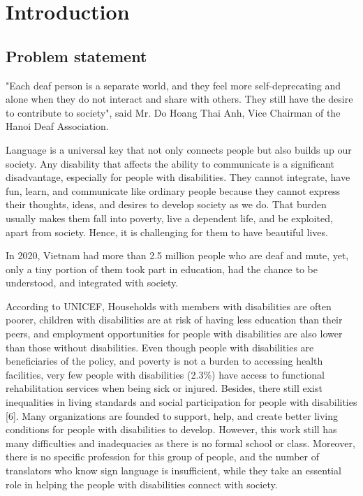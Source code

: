 \chapter{Introduction}
	
\section{Problem statement}

"Each deaf person is a separate world, and they feel more self-deprecating and alone when they do not interact and share with others. They still have the desire to contribute to society", said Mr. Do Hoang Thai Anh, Vice Chairman of the Hanoi Deaf Association\cite{MoCanhCuaHyVong}.

Language is a universal key that not only connects people but also builds up our society. Any disability that affects the ability to communicate is a significant disadvantage, especially for people with disabilities. They cannot integrate, have fun, learn, and communicate like ordinary people because they cannot express their thoughts, ideas, and desires to develop society as we do. That burden usually makes them fall into poverty, live a dependent life, and be exploited, apart from society. Hence, it is challenging for them to have beautiful lives.

In 2020, Vietnam had more than 2.5 million people who are deaf and mute, yet, only a tiny portion of them took part in education, had the chance to be understood, and integrated with society.

According to UNICEF, Households with members with disabilities are often poorer, children with disabilities are at risk of having less education than their peers, and employment opportunities for people with disabilities are also lower than those without disabilities. Even though people with disabilities are beneficiaries of the policy, and poverty is not a burden to accessing health facilities, very few people with disabilities (2.3\%) have access to functional rehabilitation services when being sick or injured. Besides, there still exist inequalities in living standards and social participation for people with disabilities [6]. Many organizations are founded to support, help, and create better living conditions for people with disabilities to develop. However, this work still has many difficulties and inadequacies as there is no formal school or class. Moreover, there is no specific profession for this group of people, and the number of translators who know sign language is insufficient, while they take an essential role in helping the people with disabilities connect with society.

